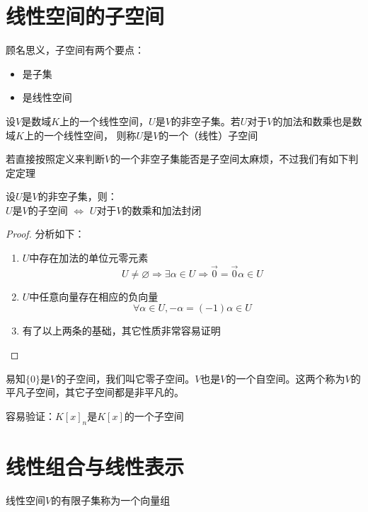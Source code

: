 \section{线性空间的子空间}
顾名思义，子空间有两个要点：
\begin{itemize}
    \item 是子集
    \item 是线性空间
\end{itemize}

\begin{definition}[子空间]
    设$V$是数域$K$上的一个线性空间，$U$是$V$的非空子集。若$U$对于$V$的加法和数乘也是数域$K$上的一个线性空间，
    则称$U$是$V$的一个（线性）子空间
\end{definition}

若直接按照定义来判断$V$的一个非空子集能否是子空间太麻烦，不过我们有如下判定定理
\begin{theorem}[子空间判定定理]
    设$U$是$V$的非空子集，则：\\
    $U$是$V$的子空间 $\Leftrightarrow$ $U$对于$V$的数乘和加法封闭
\end{theorem}
\begin{proof}
    分析如下：
    \begin{enumerate}
        \item $U$中存在加法的单位元零元素
        \begin{equation*}
            U \neq \varnothing \Rightarrow \exists \alpha \in U \Rightarrow \vec{0} = \vec{0}\alpha \in U
        \end{equation*}
        
        \item $U$中任意向量存在相应的负向量
        \begin{equation*}
            \forall \alpha \in U, -\alpha = (-1)\alpha \in U
        \end{equation*}

        \item 有了以上两条的基础，其它性质非常容易证明
    \end{enumerate}
\end{proof}

易知$\{ 0 \}$是$V$的子空间，我们叫它零子空间。$V$也是$V$的一个自空间。这两个称为$V$的平凡子空间，其它子空间都是非平凡的。

\begin{example}
    容易验证：$K[x]_n$是$K[x]$的一个子空间
\end{example}

\section{线性组合与线性表示}
\begin{definition}[向量组]
    线性空间$V$的有限子集称为一个向量组
\end{definition}

